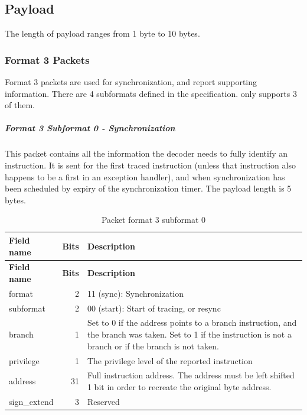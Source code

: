 \documentclass[main\_\_EN.tex]{subfiles}
\begin{document}
\subsection{Payload}

The length of payload ranges from 1 byte to 10 bytes.

\subsubsection{Format 3 Packets}

Format 3 packets are used for synchronization, and report supporting information. There are 4 subformats defined in the specification. \chipname{} only supports 3 of them.

\subparagraph{Format 3 Subformat 0 - Synchronization}\label{sec:sec:riscvtracenc-format-3-sub-0}

This packet contains all the information the decoder needs to fully identify an instruction. It is sent for the first traced instruction (unless that instruction also happens to be a first in an exception handler), and when synchronization has been scheduled by expiry of the synchronization timer. The payload length is 5 bytes.

\begin{longtable}[c]{ |l|r|L{10cm}| }
    \caption{Packet format 3 subformat 0}
    \label{tab:f3s0}
    \\\hline{}
    \textbf{Field name} & \textbf{Bits} & \textbf{Description} \\\hline
    \endfirsthead
    \textbf{Field name} & \textbf{Bits} & \textbf{Description} \\\hline
    \endhead
    \endfoot
    \endlastfoot

    format & 2 & 11 (sync): Synchronization \\\hline
    subformat & 2 & 00 (start): Start of tracing, or resync \\\hline
    branch & 1 & Set to 0 if the address points to a branch instruction, and the branch was taken. Set to 1 if the instruction is not a branch or if the branch is not taken. \\\hline
    privilege & 1 & The privilege level of the reported instruction \\\hline
    address & 31 & Full instruction address. The address must be left shifted 1 bit in order to recreate the original byte address. \\\hline
    sign\_extend & 3 & Reserved \\\hline
 \end{longtable}
\end{document}
